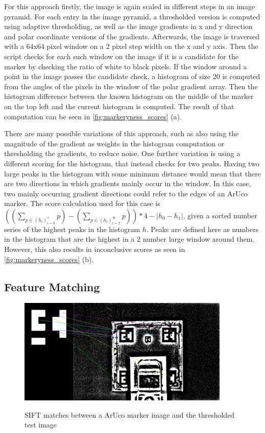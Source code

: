 \documentclass[10pt]{book}
\begin{document}
For this approach firstly, the image is again scaled in different steps in an image pyramid. For each entry in the image pyramid, a thresholded version is computed using adaptive thresholding, as well as the image gradients in x and y direction and polar coordinate versions of the gradients. Afterwards, the image is traversed with a 64x64 pixel window on a 2 pixel step width on the x and y axis. Then the script checks for each such window on the image if it is a candidate for the marker by checking the ratio of white to black pixels. If the window around a point in the image passes the candidate check, a histogram of size 20 is computed from the angles of the pixels in the window of the polar gradient array. Then the histogram difference between the known histogram on the middle of the marker on the top left and the current histogram is computed. The result of that computation can be seen in \autoref{fig:markeryness_scores} (a). 

There are many possible variations of this approach, such as also using the magnitude of the gradient as weights in the histogram computation or thresholding the gradients, to reduce noise. One further variation is using a different scoring for the histogram, that instead checks for two peaks. Having two large peaks in the histogram with some minimum distance would mean that there are two directions in which gradients mainly occur in the window. In this case, two mainly occurring gradient directions could refer to the edges of an \ac{ArUco} marker. The score calculation used for this case is $((\sum_{p \in (h_i)^1_{i=0}}p) - (\sum_{p \in (h_i)^\infty_{i=2}}p)) * 4 - |h_0 - h_1|$, given a sorted number series of the highest peaks in the histogram $h$. Peaks are defined here as numbers in the histogram that are the highest in a 2 number large window around them. However, this also results in inconclusive scores as seen in \autoref{fig:markeryness_scores} (b).

\subsection{Feature Matching}

\begin{figure}
  \caption{\ac{SIFT} matches between a \ac{ArUco} marker image and the thresholded test image}
  \includegraphics[width=0.9\textwidth]{image/classic_sift_matches}
  \label{fig:classic_sift_matches}
\end{figure}
\end{document}
